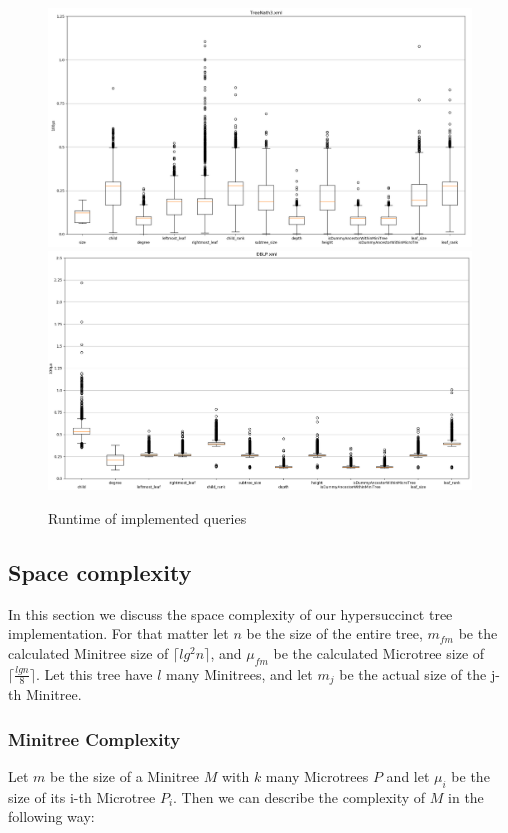 \documentclass{article}
\begin{document}
\begin{figure}[H]
\includegraphics[scale=0.3]{treeNath3_Queries}
\includegraphics[scale=0.3]{DBLP_Queries}
\caption{Runtime of implemented queries}
\label{complexQue:image1}
\end{figure}

\subsection{Space complexity}
In this section we discuss the space complexity of our hypersuccinct tree implementation. For that matter let $n$ be the size of the entire tree, $m_{fm}$ be the calculated Minitree size of $\lceil lg^{2} n \rceil$, and $\mu_{fm}$ be the calculated Microtree size of $\lceil \frac{lg n}{8} \rceil$. Let this tree have $l$ many Minitrees, and let $m_{j}$ be the actual size of the j-th Minitree.

\subsubsection{Minitree Complexity}
Let $m$ be the size of a Minitree $M$ with $k$ many Microtrees $P$ and let $\mu_{i}$ be the size of its i-th Microtree $P_{i}$. Then we can describe the complexity of $M$ in the following way:\\
\end{document}
